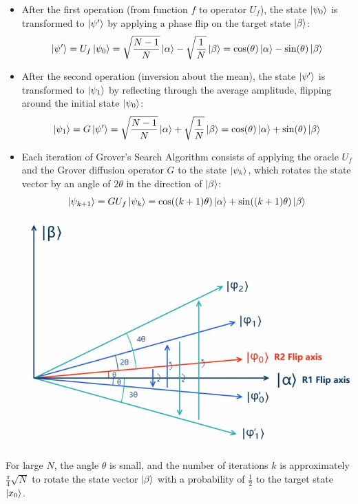 \documentclass{book}
\begin{document}
\begin{itemize}
    \item After the first operation (from function $f$ to operator $U_f$), the state $\ket{\psi_0}$ is transformed to $\ket{\psi'}$ by applying a phase flip on the target state $\ket{\beta}$:
    \[
        \ket{\psi'} = U_f\ket{\psi_0} = \sqrt{\frac{N - 1}{N}} \ket{\alpha} - \sqrt{\frac{1}{N}} \ket{\beta} = \cos(\theta)\ket{\alpha} - \sin(\theta)\ket{\beta}
    \]
    \item After the second operation (inversion about the mean), the state $\ket{\psi'}$ is transformed to $\ket{\psi_1}$ by reflecting through the average amplitude, flipping around the initial state $\ket{\psi_0}$:
    \[
        \ket{\psi_1} = G\ket{\psi'} = \sqrt{\frac{N - 1}{N}} \ket{\alpha} + \sqrt{\frac{1}{N}} \ket{\beta} = \cos(\theta)\ket{\alpha} + \sin(\theta)\ket{\beta}
    \]
    \item Each iteration of Grover's Search Algorithm consists of applying the oracle $U_f$ and the Grover diffusion operator $G$ to the state $\ket{\psi_k}$, which rotates the state vector by an angle of $2\theta$ in the direction of $\ket{\beta}$:
    \[
        \ket{\psi_{k+1}} = G U_f \ket{\psi_k} = \cos((k + 1)\theta)\ket{\alpha} + \sin((k + 1)\theta)\ket{\beta}
    \]
    \begin{center}
        \includegraphics[scale = 0.3]{ch4/ch4_figure2.jpeg}
    \end{center}
\end{itemize}
For large $N$, the angle $\theta$ is small, and the number of iterations $k$ is approximately $\frac{\pi}{4}\sqrt{N}$ to rotate the state vector $\ket{\beta}$ with a probability of $\frac{1}{2}$ to the target state $\ket{x_0}$.\\
\newpage
\end{document}

